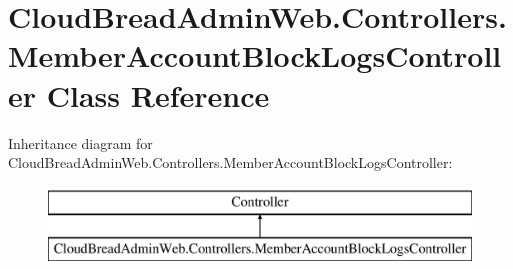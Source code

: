 \hypertarget{class_cloud_bread_admin_web_1_1_controllers_1_1_member_account_block_logs_controller}{}\section{Cloud\+Bread\+Admin\+Web.\+Controllers.\+Member\+Account\+Block\+Logs\+Controller Class Reference}
\label{class_cloud_bread_admin_web_1_1_controllers_1_1_member_account_block_logs_controller}
Inheritance diagram for Cloud\+Bread\+Admin\+Web.\+Controllers.\+Member\+Account\+Block\+Logs\+Controller\+:\begin{figure}[H]
\begin{center}
\leavevmode
\includegraphics[height=2.000000cm]{class_cloud_bread_admin_web_1_1_controllers_1_1_member_account_block_logs_controller}
\end{center}
\end{figure}

